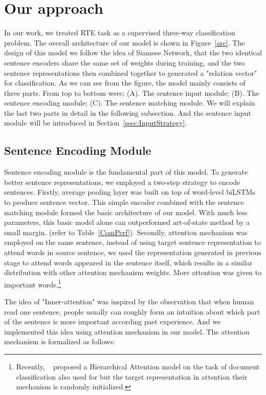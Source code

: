 \documentclass[11pt,letterpaper]{article}
\begin{document}
\section{Our approach}
In our work, we treated RTE task as a supervised three-way classification problem. The overall architecture of our model is shown in Figure~\ref{arc}. The design of this model we follow the idea of Siamese Network, that the two identical sentence encoders share the same set of weights during training, and the two sentence representations then combined together to generated a "relation vector" for classification. As we can see from the figure, the model mainly consists of three parts. From top to bottom were: (A). The sentence input module; (B). The sentence encoding module; (C). The sentence matching module. We will explain the last two parts in detail in the following subsection. And the sentence input module will be introduced in Section~\ref{ssec:InputStrategy}.

\subsection{Sentence Encoding Module}
Sentence encoding module is the fundamental part of this model. To generate better sentence representations, we employed a two-step strategy to encode sentences. Firstly, average pooling layer was built on top of word-level biLSTMs to produce sentence vector. This simple encoder combined with the sentence matching module formed the basic architecture of our model. With much less parameters, this basic model alone can outperformed art-of-state method by a small margin. (refer to Table~\ref{ComPerf}). Secondly, attention mechanism was employed on the same sentence, instead of using target sentence representation to attend words in source sentence, we used the representation generated in previous stage to attend words appeared in the sentence itself, which results in a similar distribution with other attention mechanism weights. More attention was given to important words.\footnote{Recently, ~\cite{yang2016hierarchical} proposed a Hierarchical Attention model on the task of document classification also used for but the target representation in attention their mechanism is randomly initialized.}

The idea of "Inner-attention" was inspired by the observation that when human read one sentence, people usually can roughly form an intuition about which part of the sentence is more important according past experience. And we implemented this idea using attention mechanism in our model. The attention mechanism is formalized as follows:
\end{document}
